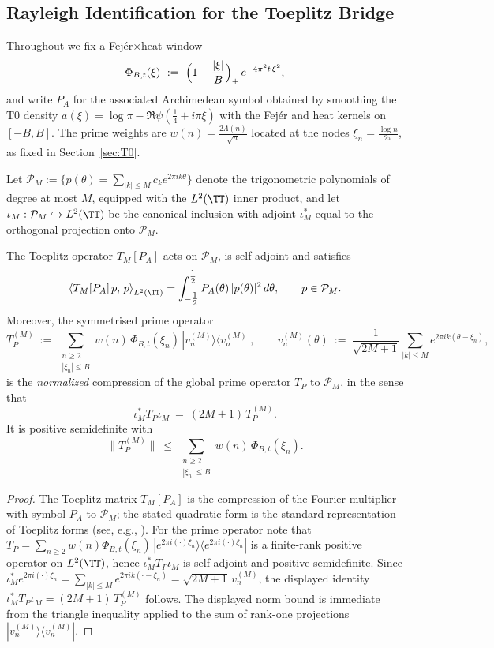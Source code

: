 
\subsection{Rayleigh Identification for the Toeplitz Bridge}\label{subsec:a3-rayleigh}
Throughout we fix a Fej\'er$\times$heat window
\[
  \Phi_{B,t}(\xi)\ :=\ \Bigl(1-\frac{|\xi|}{B}\Bigr)_{+}\,e^{-4\pi^2 t\,\xi^2},
\]
and write $P_A$ for the associated Archimedean symbol obtained by smoothing the
T0 density $a(\xi)=\log\pi-\Re\psi(\tfrac14+i\pi\xi)$ with the Fej\'er and heat kernels
on $[-B,B]$.  The prime weights are $w(n)=\frac{2\Lambda(n)}{\sqrt n}$ located at the
nodes $\xi_n=\frac{\log n}{2\pi}$, as fixed in Section~\ref{sec:T0}.

Let $\mathcal P_M:=\{p(\theta)=\sum_{|k|\le M}c_k e^{2\pi i k\theta}\}$ denote the trigonometric
polynomials of degree at most $M$, equipped with the $L^2(\TT)$ inner product, and let
$\iota_M:\mathcal P_M\hookrightarrow L^2(\TT)$ be the canonical inclusion with adjoint
$\iota_M^\ast$ equal to the orthogonal projection onto $\mathcal P_M$.

\begin{lemma}\label{lem:a3-model-space}
The Toeplitz operator $T_M[P_A]$ acts on $\mathcal P_M$, is self-adjoint and satisfies
\[
  \left\langle T_M[P_A]\,p,\,p\right\rangle_{L^2(\TT)}
  = \int_{-\tfrac12}^{\tfrac12} P_A(\theta)\,|p(\theta)|^2\,d\theta,
  \qquad p\in\mathcal P_M.
\]
Moreover, the symmetrised prime operator
\[
  T_P^{(M)}\ :=\ \sum_{\substack{n\ge2\\ |\xi_n|\le B}}
     w(n)\,\Phi_{B,t}(\xi_n)\,|v_n^{(M)}\rangle\!\langle v_n^{(M)}|,
  \qquad
  v_n^{(M)}(\theta)\ :=\ \frac{1}{\sqrt{2M+1}}\sum_{|k|\le M} e^{2\pi i k(\theta-\xi_n)},
\]
is the \emph{normalized} compression of the global prime operator $T_P$ to $\mathcal P_M$,
in the sense that
\[
  \iota_M^\ast T_P \iota_M\ =\ (2M+1)\,T_P^{(M)}.
\]
It is positive semidefinite with
\[
  \|T_P^{(M)}\| \ \le\ \sum_{\substack{n\ge2\\ |\xi_n|\le B}} w(n)\,\Phi_{B,t}(\xi_n).
\]
\end{lemma}

\begin{proof}
The Toeplitz matrix $T_M[P_A]$ is the compression of the Fourier multiplier with
symbol $P_A$ to $\mathcal P_M$; the stated quadratic form is the standard representation
of Toeplitz forms (see, e.g., \cite[Chapter~1]{GrenanderSzego1958}).  For the prime
operator note that
$T_P=\sum_{n\ge2} w(n)\Phi_{B,t}(\xi_n)\,|e^{2\pi i(\cdot)\xi_n}\rangle\!\langle e^{2\pi i(\cdot)\xi_n}|$
is a finite-rank positive operator on $L^2(\TT)$, hence
$\iota_M^\ast T_P \iota_M$ is self-adjoint and positive semidefinite. Since
$\iota_M^\ast e^{2\pi i(\cdot)\xi_n}=\sum_{|k|\le M}e^{2\pi i k(\cdot-\xi_n)}=\sqrt{2M+1}\,v_n^{(M)}$,
the displayed identity $\iota_M^\ast T_P \iota_M=(2M+1)\,T_P^{(M)}$ follows.
The displayed norm bound is immediate from the triangle inequality applied to
the sum of rank-one projections $|v_n^{(M)}\rangle\!\langle v_n^{(M)}|$.
\end{proof}

